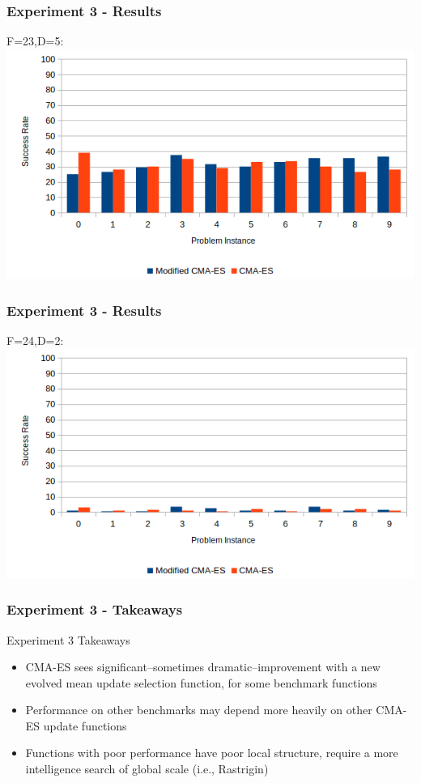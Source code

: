 \documentclass{beamer}
\begin{document}
	\begin{frame}
		\frametitle{Experiment 3 - Results}
		\centering
		F=23,D=5:
		\includegraphics[width=\textwidth]{experiment3_f23d5_bargraph}
	\end{frame}	 
	
	\begin{frame}
		\frametitle{Experiment 3 - Results}
		\centering
		F=24,D=2:
		\includegraphics[width=\textwidth]{experiment3_f24d2_bargraph}
	\end{frame}	 
	
	\begin{frame}
		\frametitle{Experiment 3 - Takeaways}
		Experiment 3 Takeaways
		\begin{itemize}
			 \item<1-|alert@1> CMA-ES sees significant--sometimes dramatic--improvement with a new evolved mean update selection function, for some benchmark functions
			 \item<2-|alert@2> Performance on other benchmarks may depend more heavily on other CMA-ES update functions
			 \item<3-|alert@3> Functions with poor performance have poor local structure, require a more intelligence search of global scale (i.e., Rastrigin)		 			 
		\end{itemize}
	\end{frame} 
	
\end{document}

